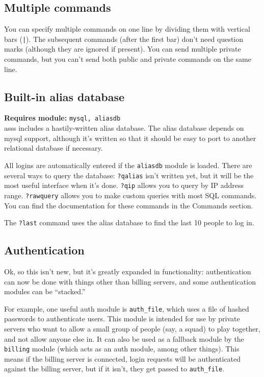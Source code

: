 \documentclass{article}
\newcommand{\asss}{asss}
\newcommand{\requiremod}[1]{\noindent\textbf{Requires module:} \texttt{#1}\\}
\begin{document}
\subsection{Multiple commands}

You can specify multiple commands on one line by dividing them with
vertical bars (\verb/|/). The subsequent commands (after the first bar)
don't need question marks (although they are ignored if present). You
can send multiple private commands, but you can't send both public and
private commands on the same line.


\subsection{Built-in alias database}

\requiremod{mysql, aliasdb}
\asss{} includes a hastily-written alias database. The alias database
depends on mysql support, although it's written so that it should be
easy to port to another relational database if necessary.

All logins are automatically entered if the \verb/aliasdb/ module is
loaded. There are several ways to query the database: \verb/?qalias/
isn't written yet, but it will be the most useful interface when it's
done. \verb/?qip/ allows you to query by IP address range.
\verb/?rawquery/ allows you to make custom queries with most SQL
commands. You can find the documentation for these commands in the
Commands section.

The \verb/?last/ command uses the alias database to find the last 10
people to log in.


\subsection{Authentication}

Ok, so this isn't new, but it's greatly expanded in functionality:
authentication can now be done with things other than billing servers,
and some authentication modules can be ``stacked.''

For example, one useful auth module is \verb/auth_file/, which uses a
file of hashed passwords to authenticate users. This module is intended
for use by private servers who want to allow a small group of people
(say, a squad) to play together, and not allow anyone else in. It can
also be used as a fallback module by the \verb/billing/ module (which
acts as an auth module, among other things). This means if the billing
server is connected, login requests will be authenticated against the
billing server, but if it isn't, they get passed to \verb/auth_file/.
\end{document}
